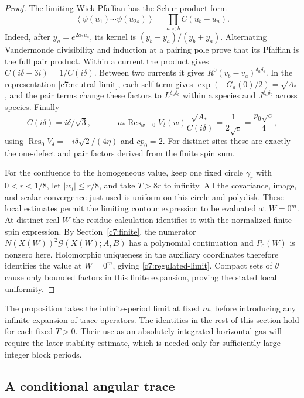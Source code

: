 \begin{proof}
The limiting Wick Pfaffian has the Schur product form
\[
\left\langle\psi(u_1)\cdots\psi(u_{2s})\right\rangle
=\prod_{a<b}C(u_b-u_a).
\]
Indeed, after $y_a=e^{2a_*u_a}$, its kernel is $(y_b-y_a)/(y_b+y_a)$. Alternating Vandermonde divisibility and induction at a pairing pole prove that its Pfaffian is the full pair product. Within a current the product gives $C(i\delta-3i)=1/C(i\delta)$. Between two currents it gives $R^0(v_b-v_a)^{\delta_a\delta_b}$. In the representation \eqref{c7:neutral-limit}, each self term gives $\exp(-G_d(0)/2)=\sqrt{A_*}$, and the pair terms change these factors to $L^{\delta_a\delta_b}$ within a species and $J^{\delta_a\delta_b}$ across species. Finally
\[
C(i\delta)=i\delta/\sqrt3,\qquad
-a_*\operatorname{Res}_{w=0}V_\delta(w)
 \frac{\sqrt{A_*}}{C(i\delta)}
=\frac1{2\sqrt c}=\frac{p_0\sqrt c}{4},
\]
using $\operatorname{Res}_0V_\delta=-i\delta\sqrt2/(4\eta)$ and $cp_0=2$. For distinct sites these are exactly the one-defect and pair factors derived from the finite spin sum.

For the confluence to the homogeneous value, keep one fixed circle $\gamma_r$ with $0<r<1/8$, let $|w_l|\le r/8$, and take $T>8r$ to infinity. All the covariance, image, and scalar convergence just used is uniform on this circle and polydisk. These local estimates permit the limiting contour expression to be evaluated at $W=0^m$. At distinct real $W$ the residue calculation identifies it with the normalized finite spin expression. By Section~\ref{c7:finite}, the numerator $N(X(W))^2\mathscr G(X(W);A,B)$ has a polynomial continuation and $P_0(W)$ is nonzero here. Holomorphic uniqueness in the auxiliary coordinates therefore identifies the value at $W=0^m$, giving \eqref{c7:regulated-limit}. Compact sets of $\theta$ cause only bounded factors in this finite expansion, proving the stated local uniformity.
\end{proof}

The proposition takes the infinite-period limit at fixed $m$, before introducing any infinite expansion of trace operators. The identities in the rest of this section hold for each fixed $T>0$. Their use as an absolutely integrated horizontal gas will require the later stability estimate, which is needed only for sufficiently large integer block periods.

\subsection{A conditional angular trace}

